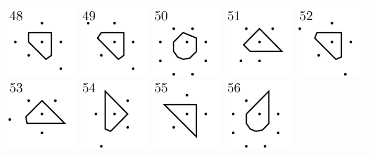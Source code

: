 \documentclass[text.tex]{subfiles}
\begin{document}
\begin{figure}[h!]
\includegraphics[width=0.16\textwidth]{img/results/circle8_concat/circle8_100000_(1_0alpha_1)_048.pdf}
\includegraphics[width=0.16\textwidth]{img/results/circle8_concat/circle8_100000_(1_0alpha_1)_049.pdf}
\includegraphics[width=0.16\textwidth]{img/results/circle8_concat/circle8_100000_(1_0alpha_1)_050.pdf}
\includegraphics[width=0.16\textwidth]{img/results/circle8_concat/circle8_100000_(1_0alpha_1)_051.pdf}
\includegraphics[width=0.16\textwidth]{img/results/circle8_concat/circle8_100000_(1_0alpha_1)_052.pdf}
\includegraphics[width=0.16\textwidth]{img/results/circle8_concat/circle8_100000_(1_0alpha_1)_053.pdf}
\includegraphics[width=0.16\textwidth]{img/results/circle8_concat/circle8_100000_(1_0alpha_1)_054.pdf}
\includegraphics[width=0.16\textwidth]{img/results/circle8_concat/circle8_100000_(1_0alpha_1)_055.pdf}
\includegraphics[width=0.16\textwidth]{img/results/circle8_concat/circle8_100000_(1_0alpha_1)_056.pdf}
\end{figure}
\end{document}
